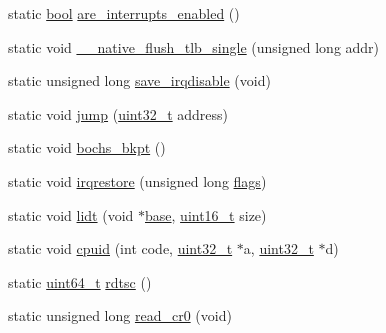\begin{DoxyCompactItemize}
\item 
static \hyperlink{a00104_af6a258d8f3ee5206d682d799316314b1_af6a258d8f3ee5206d682d799316314b1}{bool} \hyperlink{a00113_ae7df27a6150c6a020eead928af349b21_ae7df27a6150c6a020eead928af349b21}{are\+\_\+interrupts\+\_\+enabled} ()
\item 
static void \hyperlink{a00113_ad80d786594a109b21e30da4bf6f56a85_ad80d786594a109b21e30da4bf6f56a85}{\+\_\+\+\_\+native\+\_\+flush\+\_\+tlb\+\_\+single} (unsigned long addr)
\item 
static unsigned long \hyperlink{a00113_ab1dca2d7fd57d56f7548a81ef081ba74_ab1dca2d7fd57d56f7548a81ef081ba74}{save\+\_\+irqdisable} (void)
\item 
static void \hyperlink{a00113_aa090eac3bad049e35e9360403f42b565_aa090eac3bad049e35e9360403f42b565}{jump} (\hyperlink{a00104_a435d1572bf3f880d55459d9805097f62_a435d1572bf3f880d55459d9805097f62}{uint32\+\_\+t} address)
\item 
static void \hyperlink{a00113_a3f7e7be8f62f43b2b62df54cac1590be_a3f7e7be8f62f43b2b62df54cac1590be}{bochs\+\_\+bkpt} ()
\item 
static void \hyperlink{a00113_a7dd6b2cd918b8cbca3c8b0381628ca83_a7dd6b2cd918b8cbca3c8b0381628ca83}{irqrestore} (unsigned long \hyperlink{a00077_aa2585d779da0ab21273a8d92de9a0ebe_aa2585d779da0ab21273a8d92de9a0ebe}{flags})
\item 
static void \hyperlink{a00113_a31967dec32575d3d398e6d289e888d1f_a31967dec32575d3d398e6d289e888d1f}{lidt} (void $\ast$\hyperlink{a00077_a0523cedff47e2441fc198b7770ec5d3f_a0523cedff47e2441fc198b7770ec5d3f}{base}, \hyperlink{a00104_a273cf69d639a59973b6019625df33e30_a273cf69d639a59973b6019625df33e30}{uint16\+\_\+t} size)
\item 
static void \hyperlink{a00113_adacb2a50c30267ac5314bfcb92ac1d85_adacb2a50c30267ac5314bfcb92ac1d85}{cpuid} (int code, \hyperlink{a00104_a435d1572bf3f880d55459d9805097f62_a435d1572bf3f880d55459d9805097f62}{uint32\+\_\+t} $\ast$a, \hyperlink{a00104_a435d1572bf3f880d55459d9805097f62_a435d1572bf3f880d55459d9805097f62}{uint32\+\_\+t} $\ast$d)
\item 
static \hyperlink{a00104_aa232ecf786a74ce5363c36c10798d2b1_aa232ecf786a74ce5363c36c10798d2b1}{uint64\+\_\+t} \hyperlink{a00113_a47b9d70be3022fd0b5687d9794ca47bc_a47b9d70be3022fd0b5687d9794ca47bc}{rdtsc} ()
\item 
static unsigned long \hyperlink{a00113_ac85e095222f364961e091702bb6bc2ff_ac85e095222f364961e091702bb6bc2ff}{read\+\_\+cr0} (void)
\item 

\end{DoxyCompactItemize}
